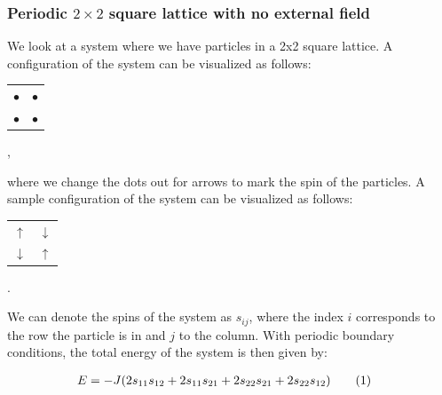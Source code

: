 \documentclass[reprint,english,notitlepage]{revtex4-1}  %
\newcommand\numberthis{\addtocounter{equation}{1}\tag{\theequation}}
\begin{document}
\subsubsection{Periodic \( 2 \times 2 \) square lattice with no external field} \label{sec:II:A:i}

We look at a system where we have particles in a 2x2 square lattice. A configuration of the system can be visualized as follows: \newline

\begin{center}
\begin{tabular}{cc}
$\bullet$ & $\bullet$ \\
$\bullet$ & $\bullet$
\end{tabular}  , \newline
\end{center}

where we change the dots out for arrows to mark the spin of the particles. A sample configuration of the system can be visualized as follows: \newline

\begin{center}
\begin{tabular}{cc}
$\uparrow$ & $\downarrow$ \\
$\downarrow$ & $\uparrow$
\end{tabular}  . \newline
\end{center}


We can denote the spins of the system as $s_{ij}$, where the index $i$ corresponds to the row the particle is in and $j$ to the column. With periodic boundary conditions, the total energy of the system is then given by:

\begin{align*}
E &= -J ( 2s_{11}s_{12} + 2s_{11}s_{21} + 2s_{22}s_{21} + 2s_{22}s_{12}) \numberthis \label{eq:2x2_sq_lattice_en}
\end{align*}
\end{document}
